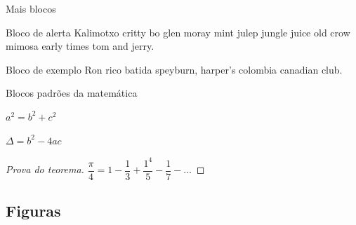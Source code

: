 \documentclass[
    brazilian, %
    12pt, %
    aspectratio = 169, %
]{beamer}
\begin{document}
\begin{frame}{Mais blocos}
    \begin{alertblock}{Bloco de alerta}
        Kalimotxo critty bo glen moray mint julep jungle juice old crow mimosa early times tom and jerry.
    \end{alertblock}

    \begin{exampleblock}{Bloco de exemplo}
        Ron rico batida speyburn, harper's colombia canadian club.
    \end{exampleblock}
\end{frame}

\begin{frame}{Blocos padrões da matemática}
    \begin{theorem}
        $ a^2 = b^2 + c^2$
    \end{theorem}

    \begin{corollary}
        $\Delta = b^2 - 4ac$
    \end{corollary}

    \begin{proof}[Prova do teorema]
        $\dfrac{\pi}{4} = 1 - \dfrac{1}{3} + \dfrac{1^4}{5} - \dfrac{1}{7} -\ldots$
    \end{proof}
\end{frame}

\subsection{Figuras}
\end{document}
